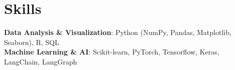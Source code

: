 \documentclass[letterpaper,11pt]{article}
\begin{document}
%
\section{Skills}
 \begin{itemize}[leftmargin=0.15in, label={}]
    \small{\item{
     \textbf{Data Analysis \& Visualization}{: Python (NumPy, Pandas, Matplotlib, Seaborn), R, SQL} \\
     \textbf{Machine Learning \& AI}{: Scikit-learn, PyTorch, Tensorflow, Keras, LangChain, LangGraph} \\
    }}
 \end{itemize}


\end{document}
